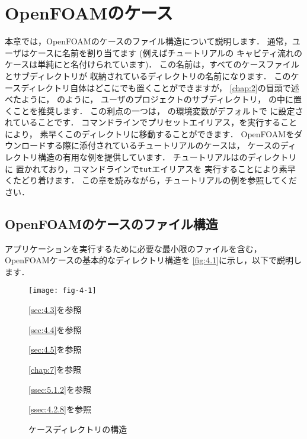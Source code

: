 \chapter{OpenFOAMのケース}
\label{chap:4}
%
%
本章では，OpenFOAMのケースのファイル構造について説明します．
通常，ユーザはケースに名前を割り当てます (例えばチュートリアルの
キャビティ流れのケースは単純にと名付けられています)．
この名前は，すべてのケースファイルとサブディレクトリが
収納されているディレクトリの名前になります．
このケースディレクトリ自体はどこにでも置くことができますが，
\autoref{chap:2}の冒頭で述べたように，
のように，
ユーザのプロジェクトのサブディレクトリ，
%
%
の中に置くことを推奨します．
この利点の一つは，
%
%
の環境変数がデフォルトで
に設定されていることです．
コマンドラインでプリセットエイリアス，を実行することにより，
素早くこのディレクトリに移動することができます．
OpenFOAMをダウンロードする際に添付されているチュートリアルのケースは，
ケースのディレクトリ構造の有用な例を提供しています．
チュートリアルはのディレクトリに
置かれており，コマンドラインで\texttt{tut}エイリアスを
実行することにより素早くたどり着けます．
この章を読みながら，チュートリアルの例を参照してください．



\section{OpenFOAMのケースのファイル構造}
\label{sec:4.1}
アプリケーションを実行するために必要な最小限のファイルを含む，
OpenFOAMケースの基本的なディレクトリ構造を
\autoref{fig:4.1}に示し，以下で説明します．


\begin{figure}[ht]
 \begin{minipage}{.6\textwidth}
  \texttt{[image: fig-4-1]}
  \hskip10pt
  \begin{minipage}[b]{7zw}
   \def\baselinestretch{1.2}\selectfont
   \autoref{sec:4.3}を参照\par
   \autoref{sec:4.4}を参照\par
   \autoref{sec:4.5}を参照\par
   \vskip28pt
   \autoref{chap:7}を参照\par
   \vskip4pt
   \autoref{ssec:5.1.2}を参照\par
   \vskip81pt
   \autoref{ssec:4.2.8}を参照\par
   \vskip-10pt\null
  \end{minipage}
 \end{minipage}
 \caption{ケースディレクトリの構造}
 \label{fig:4.1}
\end{figure}


